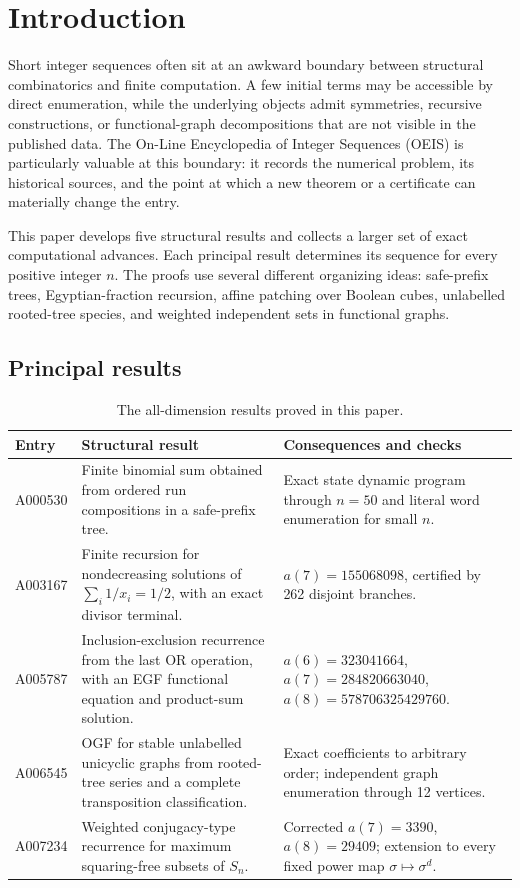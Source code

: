 \section{Introduction}

Short integer sequences often sit at an awkward boundary between structural
combinatorics and finite computation.  A few initial terms may be accessible by
direct enumeration, while the underlying objects admit symmetries, recursive
constructions, or functional-graph decompositions that are not visible in the
published data.  The On-Line Encyclopedia of Integer Sequences (OEIS)
\citep{OEIS} is particularly valuable at this boundary: it records the numerical
problem, its historical sources, and the point at which a new theorem or a
certificate can materially change the entry.

This paper develops five structural results and collects a larger set of exact
computational advances.  Each principal result determines its sequence for
every positive integer \(n\).  The proofs use several different organizing ideas:
safe-prefix trees, Egyptian-fraction
recursion, affine patching over Boolean cubes, unlabelled rooted-tree species,
and weighted independent sets in functional graphs.

\subsection{Principal results}

\begin{table}[htbp]
\centering
\small
\begin{tabularx}{\textwidth}{@{}l X X@{}}
\toprule
Entry & Structural result & Consequences and checks \\
\midrule
A000530 & Finite binomial sum obtained from ordered run compositions in a safe-prefix tree. & Exact state dynamic program through \(n=50\) and literal word enumeration for small \(n\). \\
A003167 & Finite recursion for nondecreasing solutions of \(\sum_i1/x_i=1/2\), with an exact divisor terminal. & \(a(7)=155068098\), certified by 262 disjoint branches. \\
A005787 & Inclusion-exclusion recurrence from the last OR operation, with an EGF functional equation and product-sum solution. & \(a(6)=323041664\), \(a(7)=284820663040\), \(a(8)=578706325429760\). \\
A006545 & OGF for stable unlabelled unicyclic graphs from rooted-tree series and a complete transposition classification. & Exact coefficients to arbitrary order; independent graph enumeration through 12 vertices. \\
A007234 & Weighted conjugacy-type recurrence for maximum squaring-free subsets of \(S_n\). & Corrected \(a(7)=3390\), \(a(8)=29409\); extension to every fixed power map \(\sigma\mapsto\sigma^d\). \\
\bottomrule
\end{tabularx}
\caption{The all-dimension results proved in this paper.}
\label{tab:principal-results}
\end{table}

